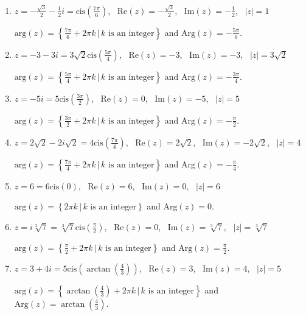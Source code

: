 \begin{enumerate}
\item $z = -\frac{\sqrt{3}}{2} - \frac{1}{2}i = \text{cis}\left(\frac{7\pi}{6}\right)$, \, $\text{Re}(z) = -\frac{\sqrt{3}}{2}$, \, $\text{Im}(z) = -\frac{1}{2}$, \, $|z| = 1$

$\text{arg}(z) = \left\{\frac{7\pi}{6} + 2\pi k \, | \, \text{$k$ is an integer} \right\}$ and $\text{Arg}(z) = -\frac{5\pi}{6}$.

\item $z = -3-3i = 3\sqrt{2}\text{cis}\left(\frac{5\pi}{4}\right)$, \, $\text{Re}(z) = -3$, \, $\text{Im}(z) =-3$, \, $|z| = 3\sqrt{2}$

$\text{arg}(z) = \left\{\frac{5\pi}{4} + 2\pi k \, | \, \text{$k$ is an integer} \right\}$ and $\text{Arg}(z) = -\frac{3\pi}{4}$.

\item $z = -5i = 5\text{cis}\left(\frac{3\pi}{2}\right)$, \, $\text{Re}(z) = 0$, \, $\text{Im}(z) = -5$, \, $|z| = 5$

$\text{arg}(z) = \left\{\frac{3\pi}{2} + 2\pi k \, | \, \text{$k$ is an integer} \right\}$ and $\text{Arg}(z) = -\frac{\pi}{2}$.

\item $z = 2\sqrt{2} - 2i\sqrt{2} = 4\text{cis}\left(\frac{7\pi}{4}\right)$, \, $\text{Re}(z) = 2\sqrt{2}$, \, $\text{Im}(z) = -2\sqrt{2}$, \, $|z| = 4$

$\text{arg}(z) = \left\{\frac{7\pi}{4} + 2\pi k \, | \, \text{$k$ is an integer} \right\}$ and $\text{Arg}(z) = -\frac{\pi}{4}$.

\item $z =6 = 6\text{cis}\left(0\right)$, \, $\text{Re}(z) = 6$, \, $\text{Im}(z) = 0$, \, $|z| = 6$

$\text{arg}(z) = \left\{2\pi k \, | \, \text{$k$ is an integer} \right\}$ and $\text{Arg}(z) =0$.

\item $z = i \sqrt[3]{7} = \sqrt[3]{7}\text{cis}\left(\frac{\pi}{2}\right)$, \, $\text{Re}(z) =0$, \, $\text{Im}(z) = \sqrt[3]{7}$, \, $|z| = \sqrt[3]{7}$

$\text{arg}(z) = \left\{\frac{\pi}{2} + 2\pi k \, | \, \text{$k$ is an integer} \right\}$ and $\text{Arg}(z) = \frac{\pi}{2}$.

\item $z = 3+4i = 5\text{cis}\left(\arctan\left(\frac{4}{3}\right)\right)$, \, $\text{Re}(z) = 3$, \, $\text{Im}(z) = 4$, \, $|z| = 5$

$\text{arg}(z) = \left\{\arctan\left(\frac{4}{3}\right) + 2\pi k \, | \, \text{$k$ is an integer} \right\}$ and $\text{Arg}(z) =\arctan\left(\frac{4}{3}\right) $.


\end{enumerate}
